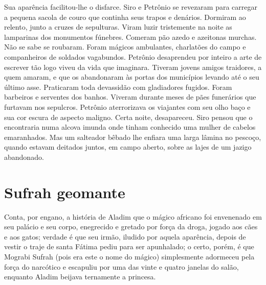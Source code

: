 Sua aparência facilitou-lhe o disfarce. Siro e Petrônio se revezaram para
carregar a pequena sacola de couro que continha seus trapos e denários.
Dormiram ao relento, junto a cruzes de sepulturas. Viram luzir tristemente
na noite as lamparinas dos monumentos fúnebres. Comeram pão azedo e
azeitonas murchas. Não se sabe se roubaram. Foram mágicos ambulantes,
charlatões do campo e companheiros de soldados vagabundos. Petrônio
desaprendeu por inteiro a arte de escrever tão logo viveu da vida que
imaginara. Tiveram jovens amigos traidores, a quem amaram, e que os
abandonaram às portas dos municípios levando até o seu último asse.
Praticaram toda devassidão com gladiadores fugidos. Foram barbeiros e
serventes dos banhos. Viveram durante meses de pães funerários que
furtavam nos sepulcros. Petrônio aterrorizava os viajantes com seu olho
baço e sua cor escura de aspecto maligno. Certa noite, desapareceu. Siro
pensou que o encontraria numa alcova imunda onde tinham conhecido uma
mulher de cabelos emaranhados. Mas um salteador bêbado lhe enfiara uma
larga lâmina no pescoço, quando estavam deitados juntos, em campo aberto,
sobre as lajes de um jazigo abandonado.

\chapter{Sufrah geomante}

Conta, por engano, a história de Aladim que o mágico africano foi
envenenado em seu palácio e seu corpo, enegrecido e gretado por força da
droga, jogado aos cães e aos gatos; verdade é que seu irmão, iludido por
aquela aparência, depois de vestir o traje de santa Fátima pediu para ser
apunhalado; o certo, porém, é que Mograbi Sufrah (pois era este o nome do
mágico) simplesmente adormeceu pela força do narcótico e escapuliu por uma
das vinte e quatro janelas do salão, enquanto Aladim beijava ternamente a
princesa.

